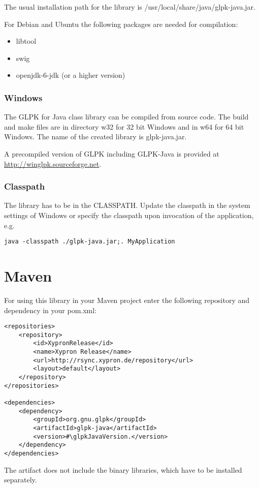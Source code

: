 \documentclass[a4paper,11pt]{report}
\newcommand{\glpkJavaVersion}{1.0.33}
\begin{document}
The usual installation path for the library is /usr/local/share/java/glpk-java.jar.

For Debian and Ubuntu the following packages are needed for compilation:
\begin{itemize}
	\item libtool
	\item swig
	\item openjdk-6-jdk (or a higher version)
\end{itemize}
\subsection{Windows}
The GLPK for Java class library can be compiled from source code. The build and make files are in directory w32 for 32 bit Windows and in w64 for 64 bit Windows. The name of the created library is glpk-java.jar.

A precompiled version of GLPK including GLPK-Java is provided at \linebreak\href{http://winglpk.sourceforge.net}{http://winglpk.sourceforge.net}.

\subsection{Classpath}
The library has to be in the CLASSPATH. Update the classpath in the system settings of Windows or specify the classpath upon invocation of the application, e.g.
\begin{verbatim}
java -classpath ./glpk-java.jar;. MyApplication
\end{verbatim}
\chapter{Maven}
For using this library in your Maven project enter the following repository and dependency in your pom.xml:
\begin{lstlisting}
<repositories>
    <repository>
        <id>XypronRelease</id>
        <name>Xypron Release</name>
        <url>http://rsync.xypron.de/repository</url>
        <layout>default</layout>
    </repository>
</repositories>

<dependencies>
    <dependency>
        <groupId>org.gnu.glpk</groupId>
        <artifactId>glpk-java</artifactId>
        <version>#\glpkJavaVersion.</version>
    </dependency>
</dependencies>
\end{lstlisting}
The artifact does not include the binary libraries, which have to be installed separately.
\end{document}
